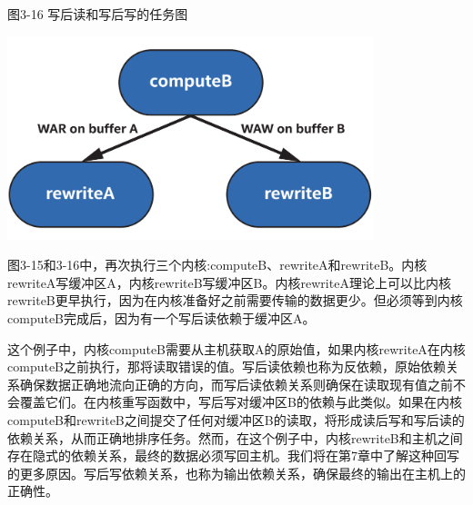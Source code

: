 \hspace*{\fill} \par %
图3-16 写后读和写后写的任务图
\begin{center}
	\includegraphics[width=0.8\textwidth]{content/chapter-3/images/9}
\end{center}

图3-15和3-16中，再次执行三个内核:computeB、rewriteA和rewriteB。内核rewriteA写缓冲区A，内核rewriteB写缓冲区B。内核rewriteA理论上可以比内核rewriteB更早执行，因为在内核准备好之前需要传输的数据更少。但必须等到内核computeB完成后，因为有一个写后读依赖于缓冲区A。\par

这个例子中，内核computeB需要从主机获取A的原始值，如果内核rewriteA在内核computeB之前执行，那将读取错误的值。写后读依赖也称为反依赖，原始依赖关系确保数据正确地流向正确的方向，而写后读依赖关系则确保在读取现有值之前不会覆盖它们。在内核重写函数中，写后写对缓冲区B的依赖与此类似。如果在内核computeB和rewriteB之间提交了任何对缓冲区B的读取，将形成读后写和写后读的依赖关系，从而正确地排序任务。然而，在这个例子中，内核rewriteB和主机之间存在隐式的依赖关系，最终的数据必须写回主机。我们将在第7章中了解这种回写的更多原因。写后写依赖关系，也称为输出依赖关系，确保最终的输出在主机上的正确性。\par





















